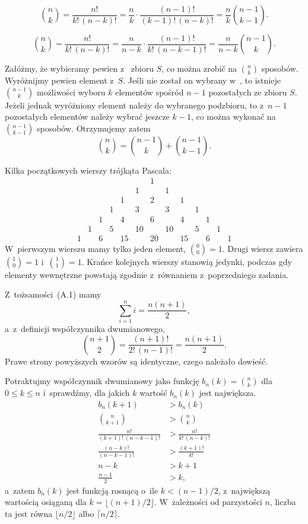 \exercise{} %
\[
	\binom{n}{k} = \frac{n!}{k!\,(n-k)!} = \frac{n}{k}\cdot\frac{(n-1)!}{(k-1)!\,(n-k)!} = \frac{n}{k}\binom{n-1}{k-1}.
\]

\exercise{} %
\[
	\binom{n}{k} = \frac{n!}{k!\,(n-k)!} = \frac{n}{n-k}\cdot\frac{(n-1)!}{k!\,(n-k-1)!} = \frac{n}{n-k}\binom{n-1}{k}.
\]

\exercise{} %
Załóżmy, że wybieramy pewien  z~ zbioru $S$, co można zrobić na $\binom{n}{k}$ sposobów. Wyróżnijmy pewien element z~$S$. Jeśli nie został on wybrany w~, to istnieje $\binom{n-1}{k}$ możliwości wyboru $k$ elementów spośród $n-1$ pozostałych ze zbioru $S$. Jeżeli jednak wyróżniony element należy do wybranego podzbioru, to z~$n-1$ pozostałych elementów należy wybrać jeszcze $k-1$, co można wykonać na $\binom{n-1}{k-1}$ sposobów. Otrzymujemy zatem
\[
	\binom{n}{k} = \binom{n-1}{k}+\binom{n-1}{k-1}.
\]

\exercise{} %
Kilka początkowych wierszy trójkąta Pascala:
\[
	\begin{array}{ccccccccccccc}
		&&&&&& 1 \\
		&&&&& 1 && 1 \\
		&&&& 1 && 2 && 1 \\
		&&& 1 && 3 && 3 && 1 \\
		&& 1 && 4 && 6 && 4 && 1 \\
		& 1 && 5 && 10 && 10 && 5 && 1 \\
		1 && 6 && 15 && 20 && 15 && 6 && 1
	\end{array}
\]
W~pierwszym wierszu mamy tylko jeden element, $\binom{0}{0}=1$. Drugi wiersz zawiera $\binom{1}{0}=1$ i~$\binom{1}{1}=1$. Krańce kolejnych wierszy stanowią jedynki, podczas gdy elementy wewnętrzne powstają zgodnie z~równaniem z~poprzedniego zadania.

\exercise{} %
Z~tożsamości~(A.1) mamy
\[
	\sum_{i=1}^ni = \frac{n(n+1)}{2},
\]
a~z~definicji współczynnika dwumianowego,
\[
	\binom{n+1}{2} = \frac{(n+1)!}{2!\,(n-1)!} = \frac{n(n+1)}{2}.
\]
Prawe strony powyższych wzorów są identyczne, czego należało dowieść.

\exercise{} %
Potraktujmy współczynnik dwumianowy jako funkcję $b_n(k)=\binom{n}{k}$ dla $0\le k\le n$ i~sprawdźmy, dla jakich $k$ wartość $b_n(k)$ jest największa.
\begin{align*}
	b_n(k+1) &> b_n(k) \\
	\binom{n}{k+1} &> \binom{n}{k} \\
	\frac{n!}{(k+1)!\,(n-k-1)!} &> \frac{n!}{k!\,(n-k)!} \\
	\frac{(n-k)!}{(n-k-1)!} &> \frac{(k+1)!}{k!} \\
	n-k &> k+1 \\
	\frac{n-1}{2} &> k,
\end{align*}
a~zatem $b_n(k)$ jest funkcją rosnącą o~ile $k<(n-1)/2$, z~największą wartością osiąganą dla $k=\lfloor(n+1)/2\rfloor$. W~zależności od parzystości $n$, liczba ta jest równa $\lfloor n/2\rfloor$ albo $\lceil n/2\rceil$.

